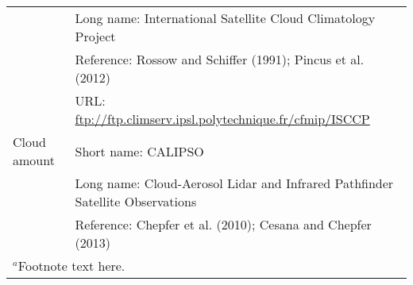 \documentclass[draft]{agujournal2019}
\begin{document}
\begin{sidewaystable}
\begin{tabular}{l l}
                                                                   & Long name: International Satellite Cloud Climatology Project   \\
                                                                   & Reference: Rossow and Schiffer (1991); Pincus et al. (2012)   \\
                                                                   & URL: \url{ftp://ftp.climserv.ipsl.polytechnique.fr/cfmip/ISCCP}     \\
   Cloud amount  & Short name: CALIPSO   \\
                           & Long name: Cloud-Aerosol Lidar and Infrared Pathfinder Satellite Observations   \\
                           & Reference: Chepfer et al. (2010); Cesana and Chepfer (2013)      \\
    \hline
 \multicolumn{2}{l}{$^{a}$Footnote text here.}
 \end{tabular}
 \end{sidewaystable}



\end{document}
